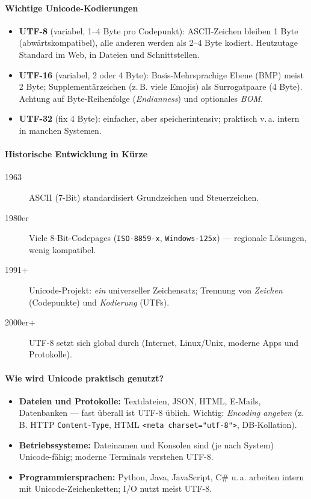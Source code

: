 \documentclass[../skript/main.tex]{subfiles}
\begin{document}
\paragraph{Wichtige Unicode-Kodierungen}
\begin{itemize}
	\item \textbf{UTF-8} (variabel, 1–4 Byte pro Codepunkt): ASCII-Zeichen bleiben 1 Byte (abwärtskompatibel), alle anderen werden als 2–4 Byte kodiert. Heutzutage Standard im Web, in Dateien und Schnittstellen.
	\item \textbf{UTF-16} (variabel, 2 oder 4 Byte): Basis-Mehrsprachige Ebene (BMP) meist 2 Byte; Supplementärzeichen (z.\,B. viele Emojis) als Surrogatpaare (4 Byte). Achtung auf Byte-Reihenfolge (\emph{Endianness}) und optionales \emph{BOM}.
	\item \textbf{UTF-32} (fix 4 Byte): einfacher, aber speicherintensiv; praktisch v.\,a. intern in manchen Systemen.
\end{itemize}

\paragraph{Historische Entwicklung in Kürze}
\begin{description}
	\item[1963] ASCII (7-Bit) standardisiert Grundzeichen und Steuerzeichen.
	\item[1980er] Viele 8-Bit-Codepages (\texttt{ISO-8859-x}, \texttt{Windows-125x}) — regionale Lösungen, wenig kompatibel.
	\item[1991+] Unicode-Projekt: \emph{ein} universeller Zeichensatz; Trennung von \emph{Zeichen} (Codepunkte) und \emph{Kodierung} (UTFs).
	\item[2000er+] UTF-8 setzt sich global durch (Internet, Linux/Unix, moderne Apps und Protokolle).
\end{description}

\paragraph{Wie wird Unicode praktisch genutzt?}
\begin{itemize}
	\item \textbf{Dateien und Protokolle:} Textdateien, JSON, HTML, E-Mails, Datenbanken — fast überall ist UTF-8 üblich. Wichtig: \emph{Encoding angeben} (z.\,B. HTTP \texttt{Content-Type}, HTML \texttt{<meta charset="utf-8">}, DB-Kollation).
	\item \textbf{Betriebssysteme:} Dateinamen und Konsolen sind (je nach System) Unicode-fähig; moderne Terminals verstehen UTF-8.
	\item \textbf{Programmiersprachen:} Python, Java, JavaScript, C\# u.\,a. arbeiten intern mit Unicode-Zeichenketten; I/O nutzt meist UTF-8.
\end{itemize}
\end{document}
